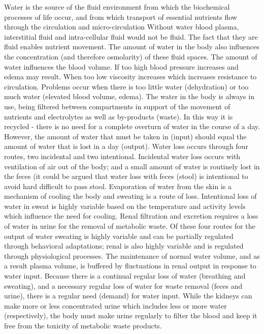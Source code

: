 Water is the source of the fluid environment from which the biochemical processes of life occur, and from which transport of essential nutrients flow through the circulation and micro-circulation Without water blood plasma, interstitial fluid and intra-cellular fluid would not be fluid. The fact that they are fluid enables nutrient movement. The amount of water in the body also influences the concentration (and therefore osmolarity) of these fluid spaces. The amount of water influences the blood volume. If too high blood pressure increases and edema may result. When too low viscosity increases which increases resistance to circulation. Problems occur when there is too little water (dehydration) or too much water (elevated blood volume, edema). The water in the body is always in use, being filtered between compartments in support of the movement of nutrients and electrolytes as well as by-products (waste). In this way it is recycled - there is no need for a complete overturn of water in the course of a day. However, the amount of water that must be taken in (input) should equal the amount of water that is lost in a day (output). Water loss occurs through four routes, two incidental and two intentional. Incidental water loss occurs with ventilation of air out of the body; and a small amount of water is routinely lost in the feces (it could be argued that water loss with feces (stool) is intentional to avoid hard difficult to pass stool. Evaporation of water from the skin is a mechanism of cooling the body and sweating is a route of loss. Intentional loss of water in sweat is highly variable based on the temperature and activity levels which influence the need for cooling. Renal filtration and excretion requires a loss of water in urine for the removal of metabolic waste. Of these four routes for the output of water sweating is highly variable and can be partially regulated through behavioral adaptations; renal is also highly variable and is regulated through physiological processes. The maintenance of normal water volume, and as a result plasma volume, is buffered by fluctuations in renal output in response to water input. Because there is a continual regular loss of water (breathing and sweating), and a necessary regular loss of water for waste removal (feces and urine), there is a regular need (demand) for water input. While the kidneys can make more or less concentrated urine which includes less or more water (respectively), the body must make urine regularly to filter the blood and keep it free from the toxicity of metabolic waste products.

